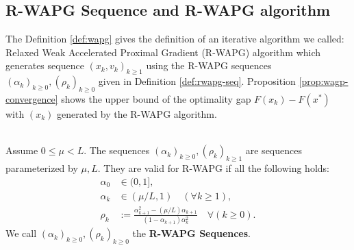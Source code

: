 \documentclass[12pt]{article}
\begin{document}
    \subsection{R-WAPG Sequence and R-WAPG algorithm}\label{ssec:rwpag-seq-and-alg}
        The Definition \ref{def:wapg} gives the definition of an iterative algorithm we called: Relaxed Weak Accelerated Proximal Gradient (R-WAPG) algorithm which generates sequence $(x_k, v_k)_{k \ge 1}$ using the R-WAPG sequences $(\alpha_k)_{k \ge 0}, (\rho_k)_{k \ge 0}$ given in Definition \ref{def:rwapg-seq}. 
        Proposition \ref{prop:wagp-convergence} shows the upper bound of the optimality gap $F(x_k) - F(x^*)$ with $(x_k)$ generated by the R-WAPG algorithm. 

        \begin{definition}\label{def:rwapg-seq}\;\\
            Assume $0 \le \mu < L$. 
            The sequences $(\alpha_k)_{k \ge 0}, (\rho_k)_{k \ge1}$ are sequences parameterized by $\mu, L$. 
            They are valid for R-WAPG if all the following holds: 
            \begin{align*}
                \alpha_0 &\in (0, 1], 
                \\
                \alpha_k &\in (\mu/L, 1) \quad (\forall k \ge 1), 
                \\
                \rho_k &:= \frac{\alpha_{k + 1}^2 - (\mu/L)\alpha_{k + 1}}{(1 - \alpha_{k + 1})\alpha_k^2} \quad \forall (k \ge 0). 
            \end{align*}
            We call $(\alpha_k)_{k \ge 0}, (\rho_k)_{k \ge 0}$ the \textbf{R-WAPG Sequences}. 
        \end{definition}
\end{document}
